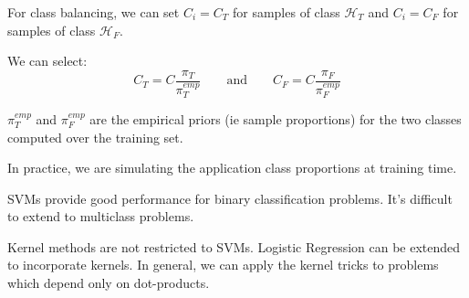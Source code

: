 For class balancing, we can set $C_i = C_T$ for samples of class $\mathcal{H}_T$ and $C_i = C_F$ for
samples of class $\mathcal{H}_F$.

We can select:
\[
C_T = C\frac{\pi_T}{\pi_T^{emp}} \qquad \text{and} \qquad C_F = C\frac{\pi_F}{\pi_F^{emp}}
\]

$\pi_T^{emp}$ and $\pi_F^{emp}$ are the empirical priors (ie sample proportions) for the two classes computed
over the training set.

In practice, we are simulating the application class proportions at training time.

SVMs provide good performance for binary classification problems. It's difficult to extend to
multiclass problems.

Kernel methods are not restricted to SVMs. Logistic Regression can be extended to
incorporate kernels. In general, we can apply the kernel tricks to problems which depend
only on dot-products.

